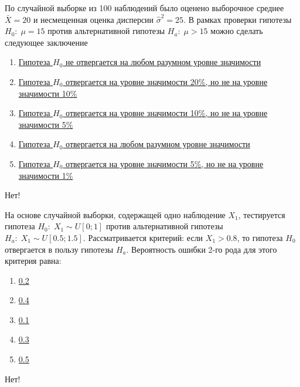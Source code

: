 \documentclass[t]{beamer}
\begin{document}
 \begin{frame} \label{12-No} 
\begin{block}{12} 

По случайной выборке из 100 наблюдений было оценено выборочное среднее $\bar{X}=20$  и несмещенная оценка дисперсии  $\hat{\sigma}^2=25$. В рамках проверки гипотезы $H_0: \; \mu=15$  против альтернативной гипотезы $H_a: \; \mu>15$  можно сделать следующее заключение
 


 \end{block} 
\begin{enumerate} 
\item[] \hyperlink{12-No}{\beamergotobutton{} Гипотеза $H_0$  не отвергается на любом разумном уровне значимости}
\item[] \hyperlink{12-No}{\beamergotobutton{} Гипотеза  $H_0$ отвергается на уровне значимости 20\%, но не  на уровне значимости 10\%}
\item[] \hyperlink{12-No}{\beamergotobutton{} Гипотеза  $H_0$ отвергается на уровне значимости 10\%, но не на уровне значимости 5\%}
\item[] \hyperlink{12-Yes}{\beamergotobutton{} Гипотеза $H_0$  отвергается на любом разумном уровне значимости}
\item[] \hyperlink{12-No}{\beamergotobutton{} Гипотеза $H_0$  отвергается на уровне значимости 5\%, но не  на уровне значимости 1\%}
\end{enumerate} 

 \alert{Нет!} 
\end{frame} 


 \begin{frame} \label{13-No} 
\begin{block}{13} 

На основе случайной выборки, содержащей одно наблюдение  $X_1$, тестируется гипотеза $H_0: \; X_1 \sim U[0;1]$  против альтернативной гипотезы  $H_a: \; X_1 \sim U[0.5;1.5]$. Рассматривается критерий: если $X_1>0.8$, то гипотеза $H_0$  отвергается в пользу гипотезы  $H_a$. Вероятность ошибки 2-го рода для этого критерия равна:
 


 \end{block} 
\begin{enumerate} 
\item[] \hyperlink{13-No}{\beamergotobutton{} 0.2}
\item[] \hyperlink{13-No}{\beamergotobutton{} 0.4}
\item[] \hyperlink{13-No}{\beamergotobutton{} 0.1}
\item[] \hyperlink{13-Yes}{\beamergotobutton{} 0.3}
\item[] \hyperlink{13-No}{\beamergotobutton{} 0.5}
\end{enumerate} 

 \alert{Нет!} 
\end{frame} 
\end{document}
